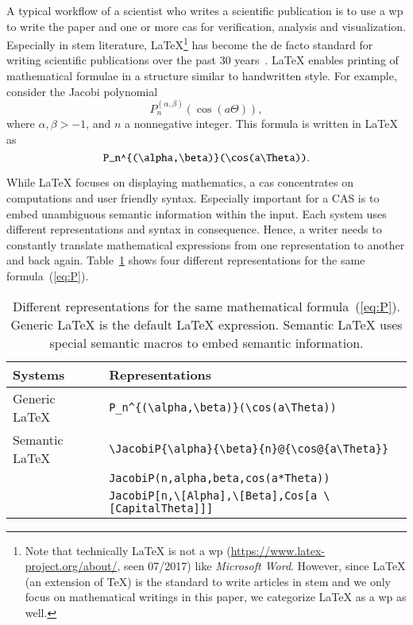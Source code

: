 A typical workflow of a scientist who writes a scientific publication is to use a \gls*{wp} to write the paper and one or more \gls*{cas} for verification, analysis and visualization. Especially in \gls*{stem} literature, \LaTeX\footnote{Note that technically \LaTeX{} is not a \gls*{wp} (\url{https://www.latex-project.org/about/}, seen 07/2017) like \textit{Microsoft Word}. However, since \LaTeX{} (an extension of \TeX) is the standard to write articles in \gls*{stem} and we only focus on mathematical writings in this paper, we categorize \LaTeX{} as a \gls*{wp} as well.} has become the de facto standard for writing scientific publications over the past 30 years~\parencites{LATEX:Standard}[559]{DigitalTypo}{Knuth}. \LaTeX{} enables printing of mathematical formulae in a structure similar to handwritten style. For example, consider the Jacobi polynomial~\parencite[18.3 in table 1]{NIST:DLMF}
\begin{equation}\label{eq:P}
P_n^{(\alpha , \beta)}(\cos(a\Theta)),
\end{equation}
where $\alpha, \beta > -1$, and $n$ a nonnegative integer. 
This formula is written in \LaTeX{} as
\begin{equation*}
\verb|P_n^{(\alpha,\beta)}(\cos(a\Theta))|.
\end{equation*}

While \LaTeX{} focuses on displaying mathematics, a \gls*{cas} concentrates on computations and user friendly syntax. Especially important for a CAS is to embed unambiguous semantic information within the input. Each system uses different representations and syntax in consequence. Hence, a writer needs to constantly translate mathematical expressions from one representation to another and back again. Table~\ref{tab:JacobiP-usecase} shows four different representations for the same formula~(\ref{eq:P}).

\begin{table}[ht]
	\centering
	\begin{tabular}{ll}
		\hline
		Systems & Representations \\
		\hline
		\hline
		Generic \LaTeX\ & \verb|P_n^{(\alpha,\beta)}(\cos(a\Theta))| \\ 
		Semantic \LaTeX\ & \verb|\JacobiP{\alpha}{\beta}{n}@{\cos@{a\Theta}}| \\
		\Maple & \verb|JacobiP(n,alpha,beta,cos(a*Theta))| \\ 
		\Mathematica & \verb|JacobiP[n,\[Alpha],\[Beta],Cos[a \[CapitalTheta]]]|\\
		\hline
	\end{tabular}
	\caption{Different representations for the same mathematical formula~(\ref{eq:P}). Generic \LaTeX{} is the default \LaTeX{} expression. Semantic \LaTeX{} uses special semantic macros to embed semantic information.}
	\label{tab:JacobiP-usecase}
\end{table}

